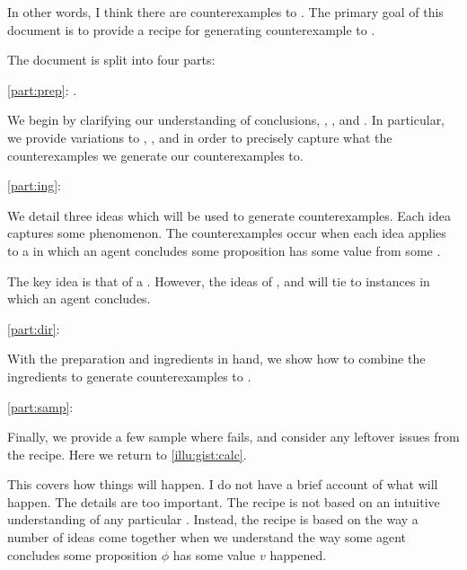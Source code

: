 \begin{note}
  In other words, I think there are counterexamples to \issueInclusion{}.
  The primary goal of this document is to provide a recipe for generating counterexample to \issueInclusion{}.

  The document is split into four parts:

  \begin{TOCEnum}
  \item
    \autoref{part:prep}: .

    We begin by clarifying our understanding of conclusions, \qWhy{}, \qHow{}, and \issueInclusion{}.
    In particular, we provide variations to \qWhy{}, \qHow{}, and \issueInclusion{} in order to precisely capture what the counterexamples we generate our counterexamples to.
  \item
    \autoref{part:ing}: 

    We detail three ideas which will be used to generate counterexamples.
    Each idea captures some phenomenon.
    The counterexamples occur when each idea applies to a  in which an agent concludes some proposition has some value from some \pool{}.

    The key idea is that of a \fc{}.
    However, the ideas of \tC{}, and \requ{} will tie  to instances in which an agent concludes.
  \item
    \autoref{part:dir}: 

    With the preparation and ingredients in hand, we show how to combine the ingredients to generate counterexamples to \issueInclusion{}.
  \item
    \autoref{part:samp}: 

    Finally, we provide a few sample  where \issueInclusion{} fails, and consider any leftover issues from the recipe.
    Here we return to \autoref{illu:gist:calc}.
  \end{TOCEnum}

  This covers how things will happen.
  I do not have a brief account of what will happen.
  The details are too important.
  The recipe is not based on an intuitive understanding of any particular \scen{}.
  Instead, the recipe is based on the way a number of ideas come together when we understand the way some agent concludes some proposition \(\phi\) has some value \(v\) happened.
\end{note}



